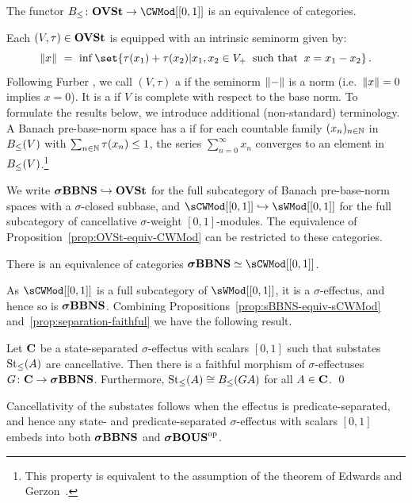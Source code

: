\documentclass[%
	submission,
copyright,creativecommons,UKenglish]{eptcs}
\begin{document}
\begin{proposition}
\label{prop:OVSt-equiv-CWMod}
The functor $\sBase\colon \OVSt\to\CWMod[[0,1]]$
is an equivalence of categories.
\end{proposition}

Each $(V,\tau)\in\mathbf{OVSt}$
is equipped with an intrinsic seminorm given by:
\[
\norm{x}\ =\ 
\inf\set{\tau(x_1)+\tau(x_2) |
x_1,x_2\in V_{+}
\;\;\textnormal{such that}\;\;
x=x_1-x_2}
\mpunct.
\]
Following Furber \cite{Furber2017},
we call $(V,\tau)$ a 
if the seminorm $\norm{-}$ is a norm
(i.e.\ $\norm{x}=0$ implies $x=0$).
It is a 
if $V$ is complete with respect to the base norm.
To formulate the results below,
we introduce additional (non-standard) terminology.
A Banach pre-base-norm space
has a 
if for each countable family $(x_n)_{n\in\mathbb{N}}$
in $B_{\le}(V)$ with $\sum_{n\in\mathbb{N}}\tau(x_n)\le 1$,
the series $\sum_{n=0}^{\infty} x_n$
converges to an element in $B_{\le}(V)$.\footnote{%
This property is equivalent to
the assumption of the theorem of
Edwards and Gerzon~\cite{EdwardsG1970}.}

We write $\boldsymbol{\sigma}\mathbf{BBNS}\hookrightarrow \mathbf{OVSt}$
for the full subcategory of
Banach pre-base-norm spaces
with a $\sigma$-closed subbase,
and $\sCWMod[[0,1]]\hookrightarrow\sWMod[[0,1]]$
for the full subcategory of cancellative
$\sigma$-weight $[0,1]$-modules.
The equivalence of Proposition~\ref{prop:OVSt-equiv-CWMod}
can be restricted to these categories.


\begin{proposition}
\label{prop:sBBNS-equiv-sCWMod}
There is an equivalence of categories $\sBBNS\simeq\sCWMod[[0,1]]$.
\end{proposition}

As $\sCWMod[[0,1]]$ is a full subcategory of $\sWMod[[0,1]]$, it
is a $\sigma$-effectus, and hence so is $\boldsymbol{\sigma}\mathbf{BBNS}$.
Combining Propositions~\ref{prop:sBBNS-equiv-sCWMod} and~\ref{prop:separation-faithful} we have the following result.

\begin{theorem}\label{thm:convex-effectus-embedding-2}
Let $\mathbf{C}$ be a state-separated $\sigma$-effectus with scalars $[0,1]$
such that substates $\mathrm{St}_{\le}(A)$ are cancellative.
Then there is a faithful morphism of $\sigma$-effectuses $G\colon\mathbf{C}\to \boldsymbol{\sigma}\mathbf{BBNS}$.
Furthermore, $\mathrm{St}_{\le}(A)\cong B_{\le}(GA)$ for all $A\in \mathbf{C}$.
\qed
\end{theorem}

\begin{remark}
Cancellativity of the substates follows when the effectus is predicate-separated, and hence any state- and predicate-separated $\sigma$-effectus with scalars $[0,1]$ embeds into both $\boldsymbol{\sigma}\mathbf{BBNS}$ and $\boldsymbol{\sigma}\mathbf{BOUS}^{\mathrm{op}}$.
\end{remark} 
\end{document}
